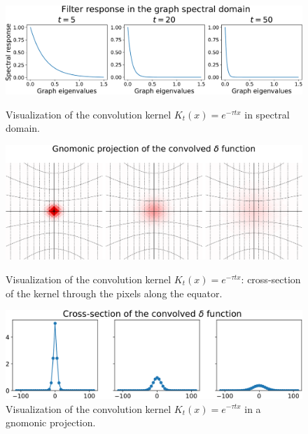 \documentclass[final,twocolumn,3p,times,sort&compress]{elsarticle}
\newcommand{\1}{\b{1}}              %
\newcommand{\0}{\b{0}}              %
\begin{document}
\begin{figure}
\centering
\includegraphics[width=\linewidth]{gaussian_filters_spectral}
\caption{Visualization of the convolution kernel $K_t(x)=e^{-\tau t x}$ in spectral domain.}
\vspace{0.3in}
\includegraphics[width=\linewidth]{gaussian_filters_gnomonic}
\caption{Visualization of the convolution kernel $K_t(x)=e^{-\tau t x}$: cross-section of the kernel through the pixels along the equator.}
\vspace{0.3in}
\includegraphics[width=\linewidth]{gaussian_filters_section}
\caption{Visualization of the convolution kernel $K_t(x)=e^{-\tau t x}$ in a gnomonic projection.}
\label{fig:gaussian_filters_visualization}
\end{figure}
\end{document}
